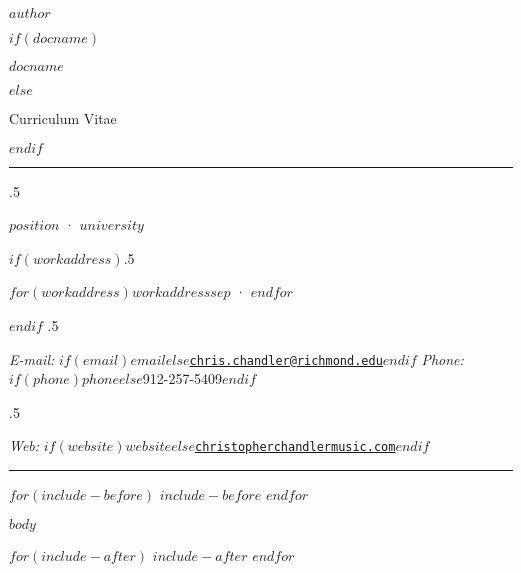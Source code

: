 \documentclass[plain, titleabove]{simplecv}
\begin{document}
\thispagestyle{empty} 		%

\centerline{\Large \textsc{$author$}}

\vspace{1 mm}

$if(docname)$\centerline{\normalsize $docname$}$else$\centerline{\normalsize Curriculum Vitae}$endif$

\vspace{2 mm}

\hrule

\vspace{2 mm}

\moveleft.5\hoffset\centerline{$position$ · $university$}
$if(workaddress)$\moveleft.5\hoffset\centerline{$for(workaddress)$$workaddress$$sep$ · $endfor$}$endif$
\moveleft.5\hoffset\centerline{
	\emph{E-mail:} \href{mailto:}{\tt $if(email)$$email$$else$chris.chandler@richmond.edu$endif$}
	\hspace{1 mm}
	\emph{Phone:} $if(phone)$$phone$$else$912-257-5409$endif$}
\moveleft.5\hoffset\centerline{
	\emph{Web:} $if(website)$\href{$website$}{\tt $website$}$else$\href{http://christopherchandlermusic.com}{\tt christopherchandlermusic.com}$endif$}

\vspace{2 mm}

\hrule

$for(include-before)$
	$include-before$
$endfor$

$body$

$for(include-after)$
	$include-after$
$endfor$
\end{document}
